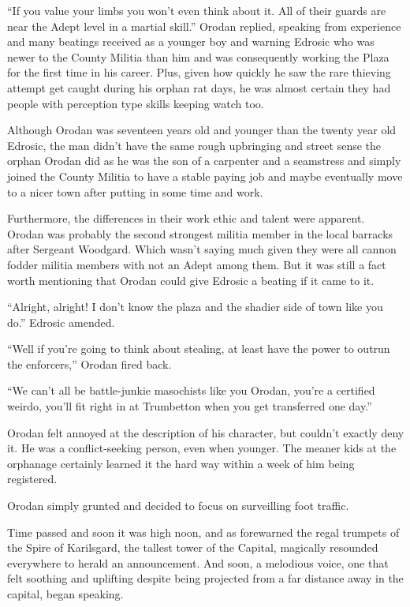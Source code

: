 \documentclass[a4paper,10pt]{book}
\begin{document}
“If you value your limbs you won’t even think about it. All of their guards are near the Adept level in a martial skill.” Orodan replied, speaking from experience and many beatings received as a younger boy and warning Edrosic who was newer to the County Militia than him and was consequently working the Plaza for the first time in his career. Plus, given how quickly he saw the rare thieving attempt get caught during his orphan rat days, he was almost certain they had people with perception type skills keeping watch too.\par
Although Orodan was seventeen years old and younger than the twenty year old Edrosic, the man didn’t have the same rough upbringing and street sense the orphan Orodan did as he was the son of a carpenter and a seamstress and simply joined the County Militia to have a stable paying job and maybe eventually move to a nicer town after putting in some time and work.\par
Furthermore, the differences in their work ethic and talent were apparent. Orodan was probably the second strongest militia member in the local barracks after Sergeant Woodgard. Which wasn’t saying much given they were all cannon fodder militia members with not an Adept among them. But it was still a fact worth mentioning that Orodan could give Edrosic a beating if it came to it.\par
“Alright, alright! I don’t know the plaza and the shadier side of town like you do.” Edrosic amended.\par
“Well if you’re going to think about stealing, at least have the power to outrun the enforcers,” Orodan fired back.\par
“We can’t all be battle-junkie masochists like you Orodan, you’re a certified weirdo, you’ll fit right in at Trumbetton when you get transferred one day.”\par
Orodan felt annoyed at the description of his character, but couldn’t exactly deny it. He was a conflict-seeking person, even when younger. The meaner kids at the orphanage certainly learned it the hard way within a week of him being registered.\par
Orodan simply grunted and decided to focus on surveilling foot traffic.\par
Time passed and soon it was high noon, and as forewarned the regal trumpets of the Spire of Karilsgard, the tallest tower of the Capital, magically resounded everywhere to herald an announcement. And soon, a melodious voice, one that felt soothing and uplifting despite being projected from a far distance away in the capital, began speaking.\par
\end{document}
